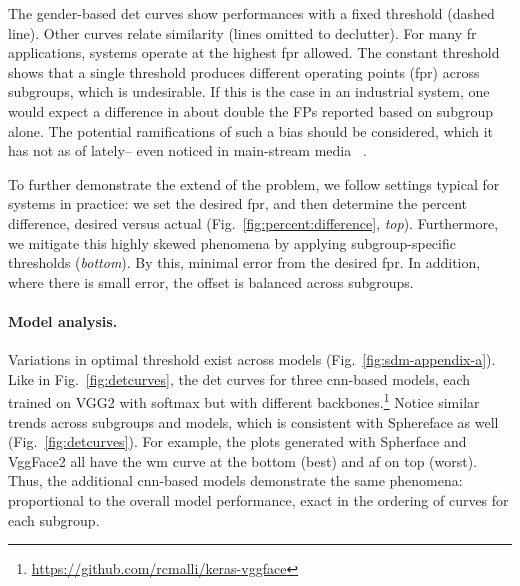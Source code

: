 
The gender-based \gls{det} curves show performances with a fixed threshold (dashed line). Other curves relate similarity (lines omitted to declutter). For many \gls{fr} applications, systems operate at the highest \gls{fpr} allowed. The constant threshold shows that a single threshold produces different operating points (\ie \gls{fpr}) across subgroups, which is undesirable. %
If this is the case in an industrial system, one would expect a difference in about double the FPs reported based on subgroup alone. The potential ramifications of such a bias should be considered, which it has not as of lately-- even noticed in main-stream media ~\cite{england2019,snow2018}.

To further demonstrate the extend of the problem, we follow settings typical for systems in practice: we set the desired \gls{fpr}, and then determine the percent difference, \ie desired versus actual (Fig.~\ref{fig:percent:difference}, \emph{top}). Furthermore, we mitigate this highly skewed phenomena by applying subgroup-specific thresholds (\emph{bottom}). By this, minimal error from the desired \gls{fpr}. In addition, where there is small error, the offset is balanced across subgroups.

\vspace{-5mm}
\noindent\paragraph{Model analysis.}
Variations in optimal threshold exist across models (Fig.~\ref{fig:sdm-appendix-a}). Like in Fig.~\ref{fig:detcurves}, the \gls{det} curves for three \gls{cnn}-based models, each trained on VGG2 with softmax but with different backbones.\footnote{\href{https://github.com/rcmalli/keras-vggface}{https://github.com/rcmalli/keras-vggface}} Notice similar trends across subgroups and models, which is consistent with  Sphereface as well (Fig.~\ref{fig:detcurves}). For example, the plots generated with Spherface and VggFace2 all have the \gls{wm} curve at the bottom (\ie best) and \gls{af} on top (\ie worst). Thus, the additional \gls{cnn}-based models demonstrate the same phenomena: proportional to the overall model performance, exact in the ordering of curves for each subgroup.


